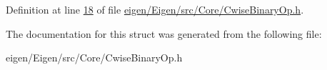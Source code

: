 Definition at line \hyperlink{eigen_2_eigen_2src_2_core_2_cwise_binary_op_8h_source_l00018}{18} of file \hyperlink{eigen_2_eigen_2src_2_core_2_cwise_binary_op_8h_source}{eigen/\+Eigen/src/\+Core/\+Cwise\+Binary\+Op.\+h}.



The documentation for this struct was generated from the following file\+:\begin{DoxyCompactItemize}
\item 
eigen/\+Eigen/src/\+Core/\+Cwise\+Binary\+Op.\+h\end{DoxyCompactItemize}
